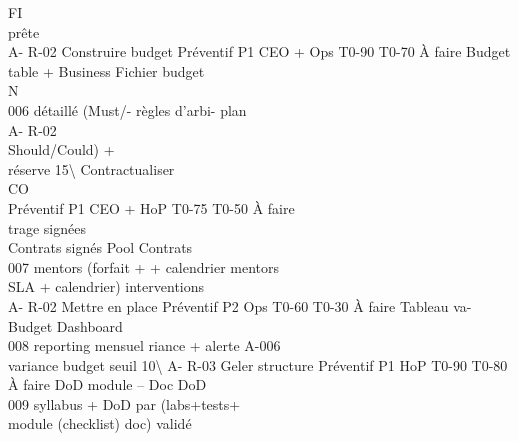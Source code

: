 \documentclass[12pt,landscape,a4paper]{article}
\begin{document}
\vspace{0.5em}
\vspace{0.5em}
FI\\
prête\\
A- R-02     Construire budget Préventif P1    CEO + Ops    T0-90 T0-70 À faire   Budget table + Business Fichier budget\\
\vspace{0.5em}
\vspace{0.5em}
\vspace{0.5em}
\vspace{0.5em}
N\\
006         détaillé (Must/-                                                     règles d’arbi- plan\\
\vspace{0.5em}
\vspace{0.5em}
\vspace{0.5em}
A- R-02\\
Should/Could) +\\
réserve 15\textbackslash{}%
Contractualiser\\
CO\\
Préventif P1   CEO + HoP    T0-75 T0-50 À faire\\
trage signées\\
\vspace{0.5em}
Contrats signés Pool    Contrats\\
007         mentors (forfait +                                                   + calendrier    mentors\\
SLA + calendrier)                                                    interventions\\
A- R-02     Mettre en place    Préventif P2   Ops          T0-60 T0-30 À faire   Tableau va-     Budget Dashboard\\
008         reporting mensuel                                                    riance + alerte A-006\\
variance budget                                                      seuil 10\textbackslash{}%
A- R-03     Geler structure    Préventif P1   HoP          T0-90 T0-80 À faire   DoD module      –       Doc DoD\\
009         syllabus + DoD par                                                   (labs+tests+\\
module (checklist)                                                   doc) validé\\
\end{document}
